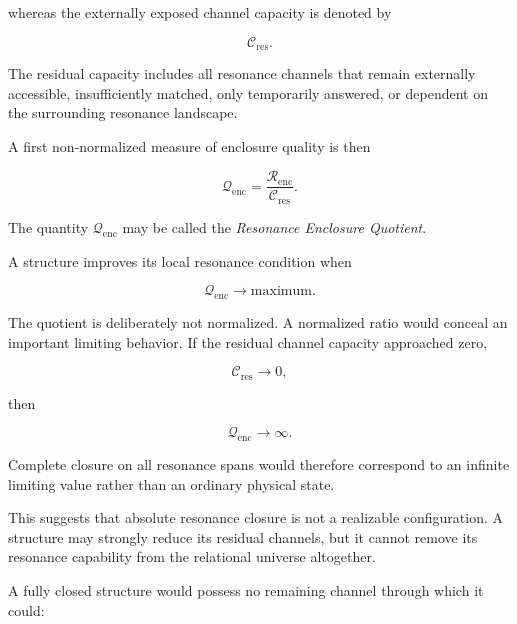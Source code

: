 \documentclass[11pt,a4paper]{article}
\begin{document}
whereas the externally exposed channel capacity is denoted by

\begin{equation}
    \mathcal{C}_{\mathrm{res}}.
\end{equation}

The residual capacity includes all resonance channels that remain externally accessible, insufficiently matched, only temporarily answered, or dependent on the surrounding resonance landscape.

A first non-normalized measure of enclosure quality is then

\begin{equation}
    \mathcal{Q}_{\mathrm{enc}}
    =
    \frac{\mathcal{R}_{\mathrm{enc}}}
         {\mathcal{C}_{\mathrm{res}}}.
    \label{eq:resonance_enclosure_quotient}
\end{equation}

The quantity $\mathcal{Q}_{\mathrm{enc}}$ may be called the \emph{Resonance Enclosure Quotient}.

A structure improves its local resonance condition when

\begin{equation}
    \mathcal{Q}_{\mathrm{enc}}
    \rightarrow \mathrm{maximum}.
\end{equation}

The quotient is deliberately not normalized. A normalized ratio would conceal an important limiting behavior. If the residual channel capacity approached zero,

\begin{equation}
    \mathcal{C}_{\mathrm{res}} \rightarrow 0,
\end{equation}

then

\begin{equation}
    \mathcal{Q}_{\mathrm{enc}} \rightarrow \infty.
\end{equation}

Complete closure on all resonance spans would therefore correspond to an infinite limiting value rather than an ordinary physical state.

This suggests that absolute resonance closure is not a realizable configuration. A structure may strongly reduce its residual channels, but it cannot remove its resonance capability from the relational universe altogether.

A fully closed structure would possess no remaining channel through which it could:
\end{document}
